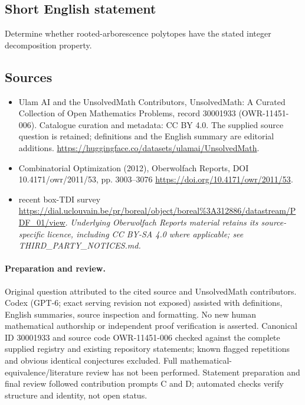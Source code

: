 \documentclass[11pt]{article}
\begin{document}
\subsection{Short English statement}
Determine whether rooted-arborescence polytopes have the stated integer decomposition property.
\subsection{Sources}
\begin{itemize}
\item[\hypertarget{source:30001933:1}{S1}] Ulam AI and the UnsolvedMath Contributors, UnsolvedMath: A Curated Collection of Open Mathematics Problems, record 30001933 (OWR-11451-006). Catalogue curation and metadata: CC BY 4.0. The supplied source question is retained; definitions and the English summary are editorial additions.
\url{https://huggingface.co/datasets/ulamai/UnsolvedMath}.
\item[\hypertarget{source:30001933:2}{S2}] Combinatorial Optimization (2012), Oberwolfach Reports, DOI 10.4171/owr/2011/53, pp. 3003--3076
\url{https://doi.org/10.4171/owr/2011/53}.
\item[\hypertarget{source:30001933:3}{S3}] recent box-TDI survey
\url{https://dial.uclouvain.be/pr/boreal/object/boreal%3A312886/datastream/PDF_01/view}.
\textit{Underlying Oberwolfach Reports material retains its source-specific licence, including CC BY-SA 4.0 where applicable; see THIRD\_PARTY\_NOTICES.md.}
\end{itemize}
\paragraph{Preparation and review.}
Original question attributed to the cited source and UnsolvedMath contributors. Codex (GPT-6; exact serving revision not exposed) assisted with definitions, English summaries, source inspection and formatting. No new human mathematical authorship or independent proof verification is asserted. Canonical ID 30001933 and source code OWR-11451-006 checked against the complete supplied registry and existing repository statements; known flagged repetitions and obvious identical conjectures excluded. Full mathematical-equivalence/literature review has not been performed. Statement preparation and final review followed contribution prompts C and D; automated checks verify structure and identity, not open status.
\label{end:30001933}
\end{document}
